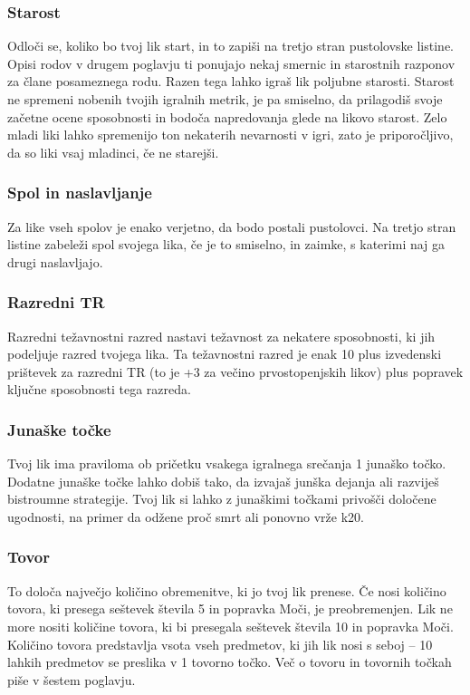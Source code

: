 \subsubsection{Starost}
Odloči se, koliko bo tvoj lik start, in to zapiši na tretjo stran pustolovske listine. Opisi rodov v drugem poglavju ti ponujajo nekaj smernic in starostnih razponov za člane posameznega rodu. Razen tega lahko igraš lik poljubne starosti. Starost ne spremeni nobenih tvojih igralnih metrik, je pa smiselno, da prilagodiš svoje začetne ocene sposobnosti in bodoča napredovanja glede na likovo starost. Zelo mladi liki lahko spremenijo ton nekaterih nevarnosti v igri, zato je priporočljivo, da so liki vsaj mladinci, če ne starejši.

\subsubsection{Spol in naslavljanje}
Za like vseh spolov je enako verjetno, da bodo postali pustolovci. Na tretjo stran listine zabeleži spol svojega lika, če je to smiselno, in zaimke, s katerimi naj ga drugi naslavljajo.

\subsubsection{Razredni TR}
Razredni težavnostni razred nastavi težavnost za nekatere sposobnosti, ki jih podeljuje razred tvojega lika. Ta težavnostni razred je enak 10 plus izvedenski prištevek za razredni TR (to je +3 za večino prvostopenjskih likov) plus popravek ključne sposobnosti tega razreda.

\subsubsection{Junaške točke}
Tvoj lik ima praviloma ob pričetku vsakega igralnega srečanja 1 junaško točko. Dodatne junaške točke lahko dobiš tako, da izvajaš junška dejanja ali razviješ bistroumne strategije. Tvoj lik si lahko z junaškimi točkami privošči določene ugodnosti, na primer da odžene proč smrt ali ponovno vrže k20.

\subsubsection{Tovor}
To določa največjo količino obremenitve, ki jo tvoj lik prenese. Če nosi količino tovora, ki presega seštevek števila 5 in popravka Moči, je preobremenjen. Lik ne more nositi količine tovora, ki bi presegala seštevek števila 10 in popravka Moči. Količino tovora predstavlja vsota vseh predmetov, ki jih lik nosi s seboj -- 10 lahkih predmetov se preslika v 1 tovorno točko. Več o tovoru in tovornih točkah piše v šestem poglavju.

